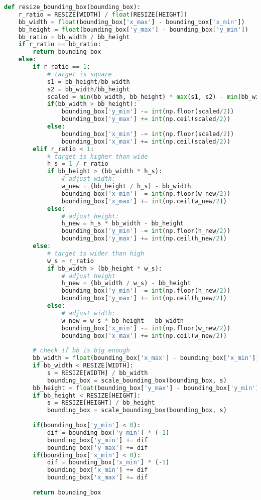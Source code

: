\begin{lstlisting}[frame=single,language=python]
def resize_bounding_box(bounding_box):
	r_ratio = RESIZE[WIDTH] / float(RESIZE[HEIGHT])
	bb_width = float(bounding_box['x_max'] - bounding_box['x_min'])
	bb_height = float(bounding_box['y_max'] - bounding_box['y_min'])
	bb_ratio = bb_width / bb_height
	if r_ratio == bb_ratio:
		return bounding_box
	else:
		if r_ratio == 1:
			# target is square
			s1 = bb_height/bb_width
			s2 = bb_width/bb_height
			scaled = min(bb_width, bb_height) * max(s1, s2) - min(bb_width, bb_height)
			if(bb_width > bb_height):
				bounding_box['y_min'] -= int(np.floor(scaled/2))
				bounding_box['y_max'] += int(np.ceil(scaled/2))
			else:
				bounding_box['x_min'] -= int(np.floor(scaled/2))
				bounding_box['x_max'] += int(np.ceil(scaled/2))
		elif r_ratio < 1:
			# target is higher than wide
			h_s = 1 / r_ratio
			if bb_height > (bb_width * h_s):
				# adjust width:
				w_new = (bb_height / h_s) - bb_width
				bounding_box['x_min'] -= int(np.floor(w_new/2))
				bounding_box['x_max'] += int(np.ceil(w_new/2))
			else:
				# adjust height:
				h_new = h_s * bb_width - bb_height
				bounding_box['y_min'] -= int(np.floor(h_new/2))
				bounding_box['y_max'] += int(np.ceil(h_new/2))
		else:
			# target is wider than high
			w_s = r_ratio
			if bb_width > (bb_height * w_s):
				# adjust height
				h_new = (bb_width / w_s) - bb_height
				bounding_box['y_min'] -= int(np.floor(h_new/2))
				bounding_box['y_max'] += int(np.ceil(h_new/2))
			else:
				# adjust width:
				w_new = w_s * bb_height - bb_width
				bounding_box['x_min'] -= int(np.floor(w_new/2))
				bounding_box['x_max'] += int(np.ceil(w_new/2))
		
		# check if bb is big enough
		bb_width = float(bounding_box['x_max'] - bounding_box['x_min'])
		if bb_width < RESIZE[WIDTH]:
			s = RESIZE[WIDTH] / bb_width
			bounding_box = scale_bounding_box(bounding_box, s)
		bb_height = float(bounding_box['y_max'] - bounding_box['y_min'])
		if bb_height < RESIZE[HEIGHT]:
			s = RESIZE[HEIGHT] / bb_height
			bounding_box = scale_bounding_box(bounding_box, s)
		
		if(bounding_box['y_min'] < 0):
			dif = bounding_box['y_min'] * (-1)
			bounding_box['y_min'] += dif
			bounding_box['y_max'] += dif
		if(bounding_box['x_min'] < 0):
			dif = bounding_box['x_min'] * (-1)
			bounding_box['x_min'] += dif
			bounding_box['x_max'] += dif
	
		return bounding_box
\end{lstlisting}


